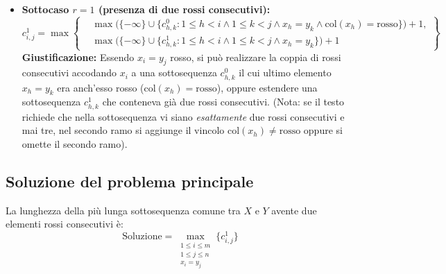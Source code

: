 \begin{itemize}
\begin{itemize}
        \item \textbf{Sottocaso $r = 1$ (presenza di due rossi consecutivi):}
        \[
            c_{i,j}^1 = \max \left\{
            \begin{aligned}
                &\max \Big( \{-\infty\} \cup \{ c_{h,k}^0 : 1 \le h < i \land 1 \le k < j \land x_h = y_k \land \text{col}(x_h) = \text{rosso} \} \Big) + 1, \\
                &\max \Big( \{-\infty\} \cup \{ c_{h,k}^1 : 1 \le h < i \land 1 \le k < j \land x_h = y_k \} \Big) + 1
            \end{aligned}
            \right\}
        \]
        \textbf{Giustificazione:} Essendo $x_i = y_j$ rosso, si può realizzare la coppia di rossi consecutivi accodando $x_i$ a una sottosequenza $c_{h,k}^0$ il cui ultimo elemento $x_h = y_k$ era anch'esso rosso ($\text{col}(x_h) = \text{rosso}$), oppure estendere una sottosequenza $c_{h,k}^1$ che conteneva già due rossi consecutivi. (Nota: se il testo richiede che nella sottosequenza vi siano \emph{esattamente} due rossi consecutivi e mai tre, nel secondo ramo si aggiunge il vincolo $\text{col}(x_h) \neq \text{rosso}$ oppure si omette il secondo ramo).
    \end{itemize}
\end{itemize}

\subsection{Soluzione del problema principale}
La lunghezza della più lunga sottosequenza comune tra $X$ e $Y$ avente due elementi rossi consecutivi è:
\[
    \text{Soluzione} = \max_{\substack{1 \le i \le m \\ 1 \le j \le n \\ x_i = y_j}} \{ c_{i,j}^1 \}
\]


